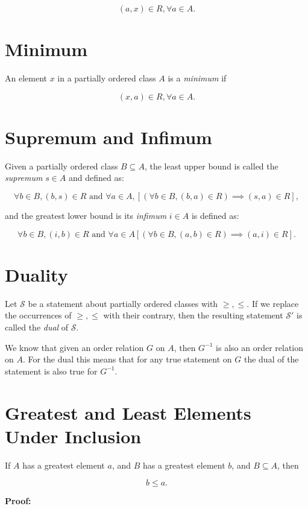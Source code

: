 \[
	(a, x) \in R, \forall a \in A.
\]

\section{Minimum}

An element \(x\) in a partially ordered class \(A\) is a \emph{minimum} if

\[
	(x, a) \in R, \forall a \in A.
\]

\section{Supremum and Infimum}

Given a partially ordered class \(B \subseteq A\), the least upper bound is called the \emph{supremum} \(s \in A\) and defined as:

\[
	\forall b \in B, (b, s) \in R \text{ and } \forall a \in A, [(\forall b \in B, (b, a) \in R) \implies (s, a) \in R],
\]

and the greatest lower bound is its \emph{infimum} \(i \in A\) is defined as:

\[
	\forall b \in B, (i, b) \in R \text{ and } \forall a \in A [(\forall b \in B, (a, b) \in R) \implies (a, i) \in R].
\]

\section{Duality}

Let \(\mathscr{S}\) be a statement about partially ordered classes with \(\ge, \le\). If we replace the occurrences of
\(\ge, \le\) with their contrary, then the resulting statement \(\mathscr{S}'\) is called the \emph{dual} of \(\mathscr{S}\).

We know that given an order relation \(G\) on \(A\), then \(G^{-1}\) is also an order relation on \(A\). For the dual this means that for
any true statement on \(G\) the dual of the statement is also true for \(G^{-1}\).

\section{Greatest and Least Elements Under Inclusion}

If \(A\) has a greatest element \(a\), and \(B\) has a greatest element \(b\), and \(B \subseteq A\), then

\[
	b \le a.
\]

\textbf{Proof:}

